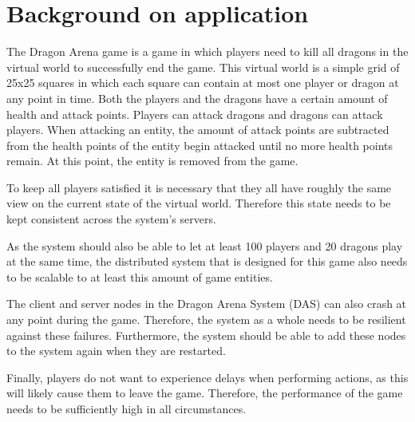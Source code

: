 \section{Background on application}
\label{sec:background}

The Dragon Arena game is a game in which players need to kill all dragons in the virtual world to successfully end the game. 
This virtual world is a simple grid of 25x25 squares in which each square can contain at most one player or dragon at any point in time. 
Both the players and the dragons have a certain amount of health and attack points. 
Players can attack dragons and dragons can attack players. When attacking an entity, the amount of attack points are subtracted from the health points of the entity begin attacked until no more health points remain. At this point, the entity is removed from the game.

To keep all players satisfied it is necessary that they all have roughly the same view on the current state of the virtual world. 
Therefore this state needs to be kept consistent across the system's servers.

As the system should also be able to let at least 100 players and 20 dragons play at the same time, the distributed system that is designed for this game also needs to be scalable to at least this amount of game entities.

The client and server nodes in the Dragon Arena System (DAS) can also crash at any point during the game. 
Therefore, the system as a whole needs to be resilient against these failures. 
Furthermore, the system should be able to add these nodes to the system again when they are restarted.

Finally, players do not want to experience delays when performing actions, as this will likely cause them to leave the game.
Therefore, the performance of the game needs to be sufficiently high in all circumstances.